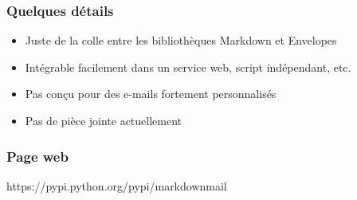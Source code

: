\documentclass{beamer}
\begin{document}
\begin{frame}
\frametitle{Quelques détails}

  \begin{itemize}
    \item Juste de la colle entre les bibliothèques Markdown et Envelopes
    \item Intégrable facilement dans un service web, script indépendant, etc.
    \item Pas conçu pour des e-mails fortement personnalisés
    \item Pas de pièce jointe actuellement
  \end{itemize}

\end{frame}


\begin{frame}
\frametitle{Page web}
\begin{center}
https://pypi.python.org/pypi/markdownmail
\end{center}

\end{frame}
\end{document}
